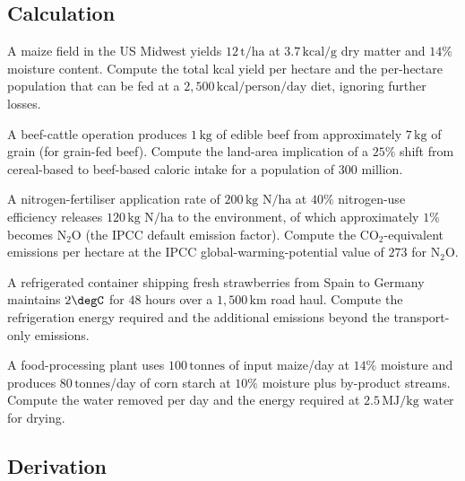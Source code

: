 \subsection*{Calculation}

\begin{exercise}
A maize field in the US Midwest yields $12\,\text{t/ha}$ at $3.7\,\text{kcal/g}$ dry matter and $14\%$ moisture content. Compute the total kcal yield per hectare and the per-hectare population that can be fed at a $2{,}500\,\text{kcal/person/day}$ diet, ignoring further losses.
\end{exercise}

\begin{exercise}
A beef-cattle operation produces $1\,\text{kg}$ of edible beef from approximately $7\,\text{kg}$ of grain (for grain-fed beef). Compute the land-area implication of a $25\%$ shift from cereal-based to beef-based caloric intake for a population of $300$ million.
\end{exercise}

\begin{exercise}
A nitrogen-fertiliser application rate of $200\,\text{kg N/ha}$ at $40\%$ nitrogen-use efficiency releases $120\,\text{kg N/ha}$ to the environment, of which approximately $1\%$ becomes N$_2$O (the IPCC default emission factor). Compute the CO$_2$-equivalent emissions per hectare at the IPCC global-warming-potential value of $273$ for N$_2$O.
\end{exercise}

\begin{exercise}
A refrigerated container shipping fresh strawberries from Spain to Germany maintains $2\degC$ for $48$ hours over a $1{,}500\,\text{km}$ road haul. Compute the refrigeration energy required and the additional emissions beyond the transport-only emissions.
\end{exercise}

\begin{exercise}
A food-processing plant uses $100\,\text{tonnes}$ of input maize/day at $14\%$ moisture and produces $80\,\text{tonnes}$/day of corn starch at $10\%$ moisture plus by-product streams. Compute the water removed per day and the energy required at $2.5\,\text{MJ/kg water}$ for drying.
\end{exercise}

\subsection*{Derivation}


